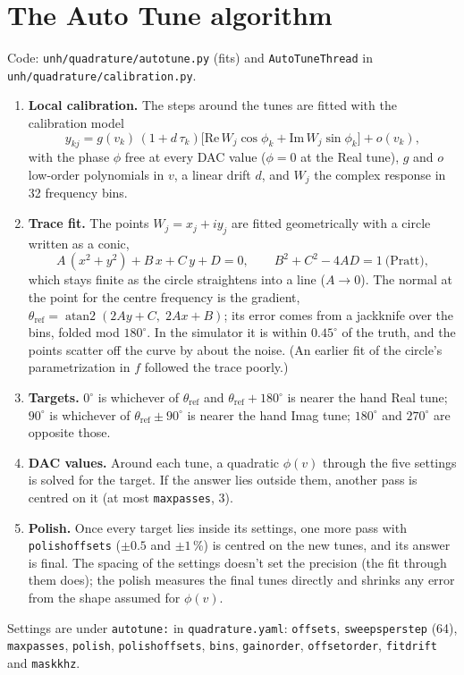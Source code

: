 \documentclass[11pt]{article}
\newcommand{\code}[1]{\texttt{\begingroup\def\_{\textunderscore\allowbreak}#1\endgroup}}
\begin{document}
\section{The Auto Tune algorithm}
\label{app:algo}
Code: \code{unh/quadrature/autotune.py} (fits) and \code{AutoTuneThread} in \code{unh/quadrature/calibration.py}.
\begin{enumerate}
\item \textbf{Local calibration.} The steps around the tunes are fitted with the calibration model
  \[
  y_{kj}=g(v_k)\,(1+d\,\tau_k)\big[\mathrm{Re}\,W_j\cos\phi_k+\mathrm{Im}\,W_j\sin\phi_k\big]+o(v_k),
  \]
  with the phase $\phi$ free at every DAC value ($\phi=0$ at the Real tune), $g$ and $o$ low-order polynomials in
  $v$, a linear drift $d$, and $W_j$ the complex response in 32 frequency bins.
\item \textbf{Trace fit.} The points $W_j=x_j+iy_j$ are fitted geometrically with a circle written as a conic,
  \[
  A\,(x^2+y^2)+B\,x+C\,y+D=0,\qquad B^2+C^2-4AD=1\ \text{(Pratt)},
  \]
  which stays finite as the circle straightens into a line ($A\to0$). The normal at the point for the centre
  frequency is the gradient, $\theta_\mathrm{ref}=\operatorname{atan2}(2Ay+C,\;2Ax+B)$; its error comes from a
  jackknife over the bins, folded mod $180^\circ$. In the simulator it is within $0.45^\circ$ of the truth, and
  the points scatter off the curve by about the noise. (An earlier fit of the circle's parametrization in $f$
  followed the trace poorly.)
\item \textbf{Targets.} $0^\circ$ is whichever of $\theta_\mathrm{ref}$ and $\theta_\mathrm{ref}+180^\circ$ is nearer the
  hand Real tune; $90^\circ$ is whichever of $\theta_\mathrm{ref}\pm90^\circ$ is nearer the hand Imag tune;
  $180^\circ$ and $270^\circ$ are opposite those.
\item \textbf{DAC values.} Around each tune, a quadratic $\phi(v)$ through the five settings is solved for the
  target. If the answer lies outside them, another pass is centred on it (at most \code{max\_passes}, 3).
\item \textbf{Polish.} Once every target lies inside its settings, one more pass with \code{polish\_offsets}
  ($\pm0.5$ and $\pm1$\,\%) is centred on the new tunes, and its answer is final. The spacing of the settings
  doesn't set the precision (the fit through them does); the polish measures the final tunes directly and
  shrinks any error from the shape assumed for $\phi(v)$.
\end{enumerate}
Settings are under \code{autotune:} in \code{quadrature.yaml}: \code{offsets}, \code{sweeps\_per\_step} (64),
\code{max\_passes}, \code{polish}, \code{polish\_offsets}, \code{bins}, \code{gain\_order}, \code{offset\_order}, \code{fit\_drift} and \code{mask\_khz}.
\end{document}
